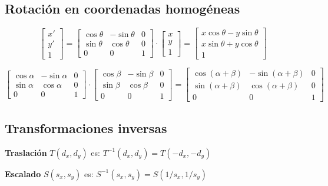 \subsection{Rotación en coordenadas homogéneas}
$$\left[\begin{matrix}
			x' \\ y' \\ 1
		\end{matrix}\right] =
	\left[\begin{matrix}
			\cos \theta & - \sin \theta & 0 \\ \sin \theta & \cos \theta & 0 \\ 0 & 0 & 1
		\end{matrix}\right] \cdot
	\left[\begin{matrix}
			x \\ y \\ 1
		\end{matrix}\right]=
	\left[\begin{matrix}
			x \cos \theta - y \sin \theta \\ x \sin \theta + y \cos \theta \\ 1
		\end{matrix}\right]$$

$$\left[\begin{matrix}
			\cos \alpha & - \sin \alpha & 0 \\ \sin \alpha & \cos \alpha & 0 \\ 0 & 0 & 1
		\end{matrix}\right] \cdot
	\left[\begin{matrix}
			\cos \beta & - \sin \beta & 0 \\ \sin \beta & \cos \beta & 0 \\ 0 & 0 & 1
		\end{matrix}\right]=
	\left[\begin{matrix}
			\cos (\alpha + \beta ) & - \sin (\alpha + \beta ) & 0 \\ \sin (\alpha + \beta ) & \cos (\alpha + \beta ) & 0 \\ 0 & 0 & 1
		\end{matrix}\right]$$

\subsection{Transformaciones inversas}
\textbf{Traslación} $T( d_x, d_y)$ es: $T^{-1} ( d_x , d_y ) = T( -d_x , -d_y )$

\textbf{Escalado} $S( s_x , s_y )$ es: $S^{-1} ( s_x , s_y ) = S(1/s_x ,1/s_y )$


